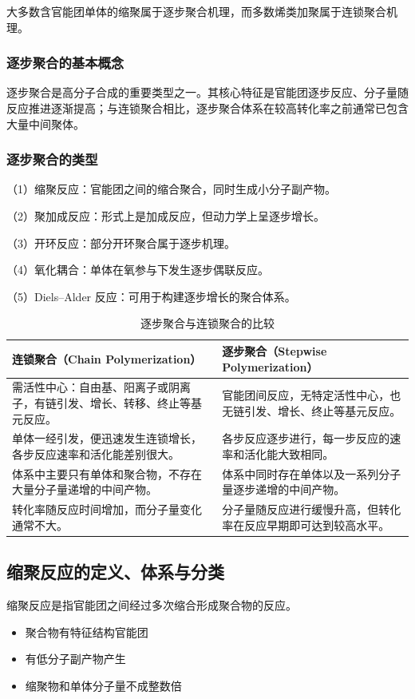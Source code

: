 ﻿\documentclass[12pt,a4paper]{article}
\renewcommand{\arraystretch}{1.18}
\begin{document}
大多数含官能团单体的缩聚属于逐步聚合机理，而多数烯类加聚属于连锁聚合机理。

\subsubsection{逐步聚合的基本概念}
逐步聚合是高分子合成的重要类型之一。其核心特征是官能团逐步反应、分子量随反应推进逐渐提高；与连锁聚合相比，逐步聚合体系在较高转化率之前通常已包含大量中间聚体。
\subsubsection{逐步聚合的类型}
（1）缩聚反应：官能团之间的缩合聚合，同时生成小分子副产物。

（2）聚加成反应：形式上是加成反应，但动力学上呈逐步增长。

（3）开环反应：部分开环聚合属于逐步机理。

（4）氧化耦合：单体在氧参与下发生逐步偶联反应。

（5）Diels--Alder 反应：可用于构建逐步增长的聚合体系。

\begin{table}[!t]
    \centering
    \caption{逐步聚合与连锁聚合的比较}
  {\small
  \setlength{\tabcolsep}{6pt}
  \renewcommand{\arraystretch}{1.2}
  \begin{tabularx}{\textwidth}{YY}
        \toprule
        \textbf{连锁聚合（Chain Polymerization）} & \textbf{逐步聚合（Stepwise Polymerization）} \\
        \midrule
      需活性中心：自由基、阳离子或阴离子，有链引发、增长、转移、终止等基元反应。 & 官能团间反应，无特定活性中心，也无链引发、增长、终止等基元反应。 \\
      单体一经引发，便迅速发生连锁增长，各步反应速率和活化能差别很大。 & 各步反应逐步进行，每一步反应的速率和活化能大致相同。 \\
      体系中主要只有单体和聚合物，不存在大量分子量递增的中间产物。 & 体系中同时存在单体以及一系列分子量逐步递增的中间产物。 \\
      转化率随反应时间增加，而分子量变化通常不大。 & 分子量随反应进行缓慢升高，但转化率在反应早期即可达到较高水平。 \\
        \bottomrule
    \end{tabularx}
  }
\end{table}

\subsection{缩聚反应的定义、体系与分类}
缩聚反应是指官能团之间经过多次缩合形成聚合物的反应。
\begin{tcolorbox}[colframe=red, colback=yellow]
\begin{itemize}
  \item 聚合物有特征结构官能团
  \item 有低分子副产物产生
  \item 缩聚物和单体分子量不成整数倍
\end{itemize}
\end{tcolorbox}
\end{document}
